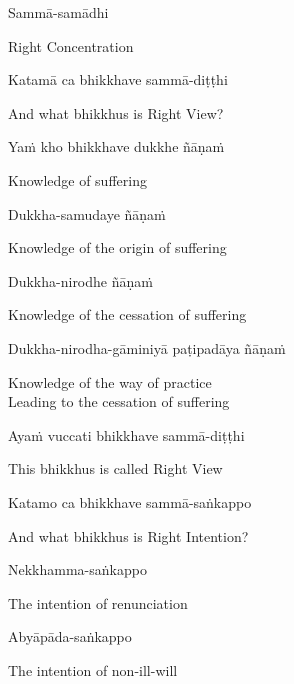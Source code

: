Sammā-samādhi

\begin{cprenglish}
  Right Concentration
\end{cprenglish}

Katamā ca bhikkhave sammā-diṭṭhi

\begin{cprenglish}
  And what bhikkhus is Right View?
\end{cprenglish}

Yaṁ kho bhikkhave dukkhe ñāṇaṁ

\begin{cprenglish}
  Knowledge of suffering
\end{cprenglish}

Dukkha-samudaye ñāṇaṁ

\begin{cprenglish}
  Knowledge of the origin of suffering
\end{cprenglish}

Dukkha-nirodhe ñāṇaṁ

\begin{cprenglish}
  Knowledge of the cessation of suffering
\end{cprenglish}

Dukkha-nirodha-gāminiyā paṭipadāya ñāṇaṁ

\begin{cprenglish}
  Knowledge of the way of practice\\
  Leading to the cessation of suffering
\end{cprenglish}

Ayaṁ vuccati bhikkhave sammā-diṭṭhi

\begin{cprenglish}
  This bhikkhus is called Right View
\end{cprenglish}

Katamo ca bhikkhave sammā-saṅkappo

\begin{cprenglish}
  And what bhikkhus is Right Intention?
\end{cprenglish}

Nekkhamma-saṅkappo

\begin{cprenglish}
  The intention of renunciation
\end{cprenglish}

Abyāpāda-saṅkappo

\begin{cprenglish}
  The intention of non-ill-will
\end{cprenglish}


